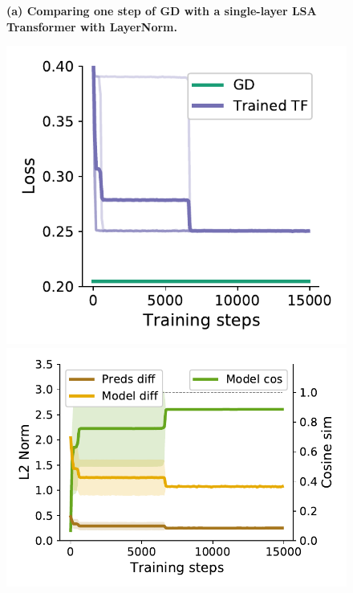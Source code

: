 \documentclass{article}
\theoremstyle{plain}
\theoremstyle{definition}
\theoremstyle{remark}
\begin{document}
\begin{figure}
\textbf{(a) Comparing one step of GD with a single-layer LSA Transformer with LayerNorm.}
\begin{center}
\begin{minipage}{.22\textwidth}
  \centering
  \begin{center}
    \includegraphics[width=1.\textwidth]{Final_figures/LayerNorm/train_23.pdf}
  \end{center}
  \vspace{-10pt}
\end{minipage}
\begin{minipage}{.28\textwidth}
  \centering
  \begin{center}
    \includegraphics[width=1.\textwidth]{Final_figures/LayerNorm/sim_7.pdf}

\end{center}
\end{minipage}
\end{center}
\end{figure}
\end{document}
